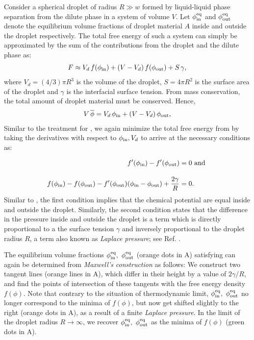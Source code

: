 Consider a spherical droplet of radius $R \gg w$ formed by liquid-liquid phase separation from the dilute phase in a system of volume $V$. 
Let $\phi^\mathrm{eq}_\mathrm{in}$ and $\phi^\mathrm{eq}_\mathrm{out}$ denote the equilibrium volume fractions of droplet material $A$ inside and outside the droplet respectively.
The total free energy of such a system can simply be approximated by the sum of the contributions from the droplet and the dilute phase as:
\begin{equation}\label{eqn:constraint_3}
    F \approx V_d\,f(\phi_\mathrm{in}) + (V - V_d)\,f(\phi_\mathrm{out}) + S\,\gamma,
\end{equation}
where $V_d = (4/3) \pi R^3$ is the volume of the droplet, $S = 4 \pi R^2$ is the surface area of the droplet and $\gamma$ is the interfacial surface tension. 
From mass conservation, the total amount of droplet material must be conserved.
Hence,
\begin{equation}\label{eqn:constraint_4}
    V\,\overline{\phi} = V_d\,\phi_\mathrm{in} + (V - V_d)\,\phi_\mathrm{out},
\end{equation}
Similar to the treatment for , we again minimize the total free energy from  by taking the derivatives with respect to $\phi_\mathrm{in}, V_d$ to arrive at the necessary conditions as:

\begin{subequations}
\label{eqn:constraint_5}
\begin{align}
    f'(\phi_\mathrm{in}) - f'(\phi_\mathrm{out}) &= 0 \mathrm{~and~}
    \\[10pt]
    f(\phi_\mathrm{in}) - f(\phi_\mathrm{out}) - f'(\phi_\mathrm{out})(\phi_\mathrm{in} - \phi_\mathrm{out}) + \frac{2 \gamma}{R} &= 0.
\end{align}
\end{subequations}
Similar to , the first condition implies that the chemical potential are equal inside and outside the droplet.
Similarly, the second condition states that the difference in the pressure inside and outside the droplet is a term which is directly proportional to a the surface tension $\gamma$ and inversely proportional to the droplet radius $R$, a term also known as \textit{Laplace pressure}; see Ref. \cite{Review2019}.

The equilibrium volume fractions $\phi^\mathrm{eq}_\mathrm{in},~\phi^\mathrm{eq}_\mathrm{out}$ (orange dots in A) satisfying  can again be determined from \textit{Maxwell's construction} as follows:
We construct two tangent lines (orange lines in A), which differ in their height by a value of $2 \gamma / R$, and find the points of intersection of these tangents with the free energy density $f(\phi)$.
Note that contrary to the situation of thermodynamic limit, $\phi^\mathrm{eq}_\mathrm{in},~\phi^\mathrm{eq}_\mathrm{out}$ no longer correspond to the minima of $f(\phi)$, but now get shifted slightly to the right (orange dots in A), as a result of a finite \textit{Laplace pressure}.
In the limit of the droplet radius $R \rightarrow \infty$, we recover $\phi^\mathrm{eq}_\mathrm{in},~\phi^\mathrm{eq}_\mathrm{out}$ as the minima of $f(\phi)$ (green dots in A). 

